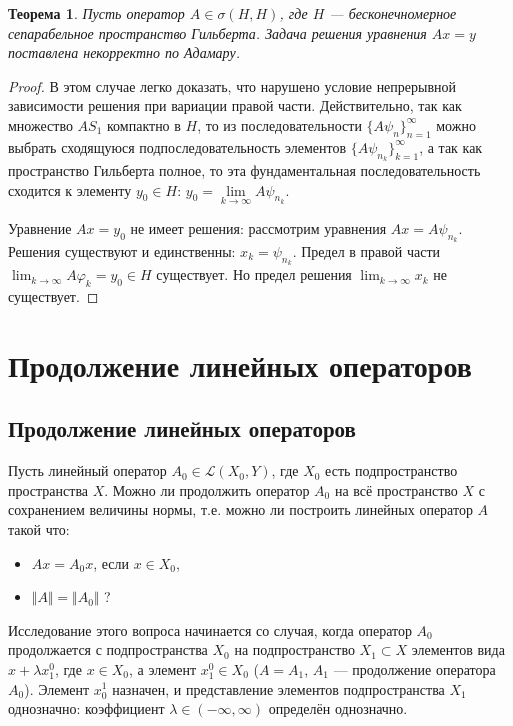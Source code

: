 \documentclass[12pt,a4paper,titlepage,oneside]{book}
\theoremstyle{definition}
\theoremstyle{plain}
\newtheorem*{theorem}{Теорема}
\theoremstyle{break}
\theoremstyle{remark}
\theoremstyle{remark}
\theoremstyle{remark}
\theoremstyle{remark}
\theoremstyle{plain}
\theoremstyle{plain}
\begin{document}
\begin{theorem}
Пусть оператор $A \in \sigma (H,H)$, где $H$ --- бесконечномерное сепарабельное пространство Гильберта. Задача решения уравнения $Ax=y$ поставлена некорректно по Адамару.
\end{theorem}

\begin{proof}
В этом случае легко доказать, что нарушено условие непрерывной зависимости решения при вариации правой части. Действительно, так как множество $AS_1$ компактно в $H$, то из последовательности $\lbrace A \psi_n\rbrace_{n=1}^{\infty}$ можно выбрать сходящуюся подпоследовательность элементов $\lbrace A \psi_{n_k}\rbrace_{k=1}^{\infty}$, а так как пространство Гильберта полное, то эта фундаментальная последовательность сходится к элементу $y_0 \in H$: $y_0=\underset{k \to \infty}{\lim} A \psi_{n_k}$.

Уравнение $Ax = y_0$ не имеет решения: рассмотрим уравнения $Ax = A \psi_{n_k}$. Решения существуют и единственны: $x_k = \psi_{n_k}$. Предел в правой части $\displaystyle\lim_{k \to \infty} A \varphi_k = y_0 \in H$ существует. Но предел решения $\displaystyle\lim_{k \to \infty} x_k$ не существует.
\end{proof}

\chapter{Продолжение линейных операторов}

\section{Продолжение линейных операторов}
Пусть линейный оператор $A_0\in \mathcal{L}(X_0,Y)$, где $X_0$ есть подпространство пространства $X$. Можно ли продолжить оператор $A_0$ на всё пространство $X$ с сохранением величины нормы, т.е. можно ли построить линейных оператор $A$ такой что:
\begin{itemize}
 \item $Ax = A_0x$, если $x\in X_0$,
 \item $\Vert A \Vert = \Vert A_0 \Vert$ ?
\end{itemize}


Исследование этого вопроса начинается со случая, когда оператор $A_0$ продолжается с подпространства $X_0$ на подпространство $X_1\subset X$ элементов вида $x+\lambda x_1^0$, где $x\in X_0$, а элемент $x_1^0 \in X_0$ ($A = A_1$, $A_1$ --- продолжение оператора $A_0$). Элемент $x_0^1$ назначен, и представление элементов подпространства $X_1$ однозначно: коэффициент $\lambda \in (-\infty , \infty)$ определён однозначно. 
\end{document}
